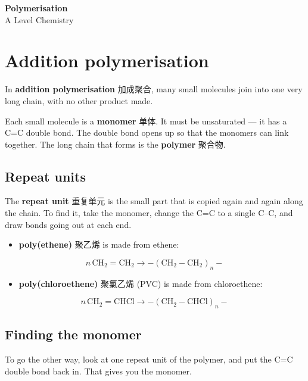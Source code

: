 \documentclass[11pt]{article}
\begin{document}
\begin{center}
  {\LARGE\bfseries Polymerisation}\\[0.35em]
  {\large A Level Chemistry}
\end{center}
\vspace{0.6em}

\section*{Addition polymerisation}

In \textbf{addition polymerisation} 加成聚合, many small molecules join into one very long chain, with no other product made.

Each small molecule is a \textbf{monomer} 单体. It must be unsaturated — it has a C=C double bond. The double bond opens up so that the monomers can link together. The long chain that forms is the \textbf{polymer} 聚合物.

\subsection*{Repeat units}

The \textbf{repeat unit} 重复单元 is the small part that is copied again and again along the chain. To find it, take the monomer, change the C=C to a single C–C, and draw bonds going out at each end.

\begin{itemize}
\item \textbf{poly(ethene)} 聚乙烯 is made from ethene:

\end{itemize}

\[
n\,\text{CH}_2{=}\text{CH}_2 \rightarrow -(\text{CH}_2{-}\text{CH}_2)_n-
\]

\begin{itemize}
\item \textbf{poly(chloroethene)} 聚氯乙烯 (PVC) is made from chloroethene:

\end{itemize}

\[
n\,\text{CH}_2{=}\text{CHCl} \rightarrow -(\text{CH}_2{-}\text{CHCl})_n-
\]

\subsection*{Finding the monomer}

To go the other way, look at one repeat unit of the polymer, and put the C=C double bond back in. That gives you the monomer.
\end{document}
